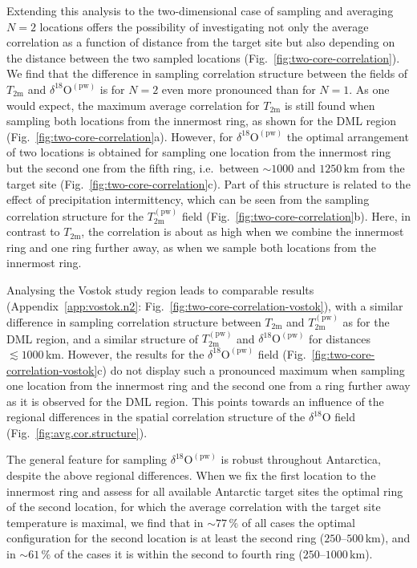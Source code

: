 \documentclass[cp, manuscript]{copernicus}
\begin{document}
Extending this analysis to the two-dimensional case of sampling and averaging
$N=2$ locations offers the possibility of investigating not only the average
correlation as a function of distance from the target site but also depending on
the distance between the two sampled locations
(Fig.~\ref{fig:two-core-correlation}). We find that the difference in sampling
correlation structure between the fields of $T_{\mathrm{2m}}$ and
$\delta^{18}\mathrm{O}^{\mathrm{(pw)}}$ is for $N=2$ even more pronounced than
for $N=1$. As one would expect, the maximum average correlation for
$T_{\mathrm{2m}}$ is still found when sampling both locations from the innermost
ring, as shown for the DML region (Fig.~\ref{fig:two-core-correlation}a).
However, for $\delta^{18}\mathrm{O}^{\mathrm{(pw)}}$ the optimal arrangement of
two locations is obtained for sampling one location from the innermost ring but
the second one from the fifth ring, i.e.\ between $\sim1000$ and $1250$\,km from
the target site (Fig.~\ref{fig:two-core-correlation}c). Part of this structure
is related to the effect of precipitation intermittency, which can be seen from
the sampling correlation structure for the $T_{\mathrm{2m}}^{\mathrm{(pw)}}$
field (Fig.~\ref{fig:two-core-correlation}b). Here, in contrast to
$T_{\mathrm{2m}}$, the correlation is about as high when we combine the
innermost ring and one ring further away, as when we sample both locations from
the innermost ring.

Analysing the Vostok study region leads to comparable results
(Appendix~\ref{app:vostok.n2}: Fig.~\ref{fig:two-core-correlation-vostok}), with
a similar difference in sampling correlation structure between $T_{\mathrm{2m}}$
and $T_{\mathrm{2m}}^{\mathrm{(pw)}}$ as for the DML region, and a similar
structure of $T_{\mathrm{2m}}^{\mathrm{(pw)}}$ and
$\delta^{18}\mathrm{O}^{\mathrm{(pw)}}$ for distances $\lesssim1000$\,km.
However, the results for the $\delta^{18}\mathrm{O}^{\mathrm{(pw)}}$ field
(Fig.~\ref{fig:two-core-correlation-vostok}c) do not display such a pronounced
maximum when sampling one location from the innermost ring and the second one
from a ring further away as it is observed for the DML region. This points
towards an influence of the regional differences in the spatial correlation
structure of the $\delta^{18}\mathrm{O}$ field
(Fig.~\ref{fig:avg.cor.structure}).

The general feature for sampling $\delta^{18}\mathrm{O}^{\mathrm{(pw)}}$ is
robust throughout Antarctica, despite the above regional differences. When we
fix the first location to the innermost ring and assess for all available
Antarctic target sites the optimal ring of the second location, for which the
average correlation with the target site temperature is maximal, we find that
in $\sim77\,\%$ of all cases the optimal configuration for the second location
is at least the second ring ($250$--$500$\,km), and in $\sim61\,\%$ of the cases
it is within the second to fourth ring ($250$--$1000$\,km).
\end{document}
